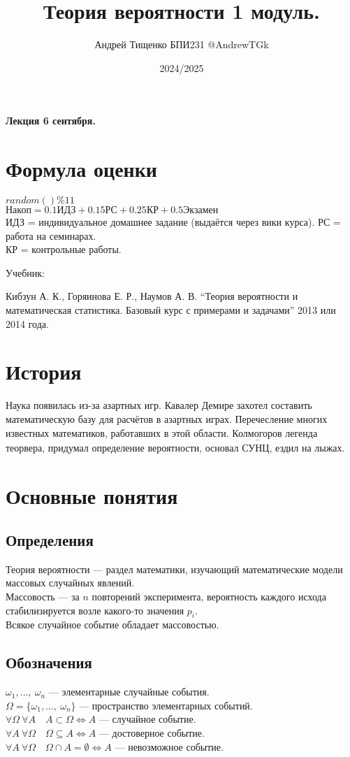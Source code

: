 \documentclass[12pt, a4paper]{article}
\title{Теория вероятности 1 модуль.}
\author{Андрей Тищенко БПИ231 @AndrewTGk}
\date{2024/2025}
\begin{document}
    \maketitle
    \begin{center}
        \textbf{Лекция 6 сентября.}
    \end{center}
    \section*{Формула оценки}
    $random()\%11$\\
    $\text{Накоп} = 0.1\text{ИДЗ} + 0.15\text{РС} + 0.25\text{КР} + 0.5\text{Экзамен}$\\
    ИДЗ = индивидуальное домашнее задание (выдаётся через вики курса).
    РС = работа на семинарах.\\
    КР = контрольные работы.
    \begin{center}
        Учебник:
    \end{center}
    Кибзун А. К., Горяинова Е. Р., Наумов А. В. ``Теория 
    вероятности и математическая статистика. Базовый курс 
    с примерами и задачами'' 2013 или 2014 года.
    \section*{История}
    Наука появилась из-за азартных игр. Кавалер Демире захотел составить 
    математическую базу для расчётов в азартных играх. Перечесление многих 
    известных математиков, работавших в этой области. $\underline{\text{Колмогоров}}$ легенда
    теорвера, придумал определение вероятности, основал СУНЦ, ездил на лыжах.\\
    \section*{Основные понятия}
    \subsection*{Определения}
    $\textit{Теория вероятности}$ --- раздел математики, изучающий математические модели массовых случайных явлений.\\
    $\textit{Массовость}$ --- за $n$ повторений эксперимента, вероятность каждого исхода стабилизируется возле какого-то значения $p_i$.\\
    Всякое случайное событие обладает массовостью.
    \subsection*{Обозначения}
    $\omega_1,\dots,\ \omega_n$ --- элементарные случайные события.\\
    $\Omega = \{\omega_1,\dots,\ \omega_n\}$ --- пространство элементарных событий.\\
    $\forall \Omega\ \forall A\quad A\subset \Omega\Leftrightarrow A$ --- случайное событие.\\
    $\forall A\ \forall \Omega\quad  \Omega\subseteq A\Leftrightarrow A$ --- достоверное событие.\\
    $\forall A\ \forall \Omega\quad \Omega\cap A = \emptyset\Leftrightarrow A$ --- невозможное событие.\\
\end{document}
